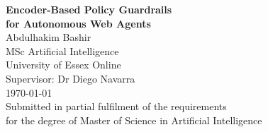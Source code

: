 \documentclass[12pt,a4paper]{article}
\begin{document}
\hypersetup{pageanchor=false}

\begin{titlepage}
\centering\vspace*{3cm}
{\LARGE\bfseries Encoder-Based Policy Guardrails\\[8pt]
for Autonomous Web Agents}\\[2cm]
{\large Abdulhakim Bashir}\\[0.5cm]
{\normalsize MSc Artificial Intelligence}\\[0.3cm]
{\normalsize University of Essex Online}\\[0.3cm]
{\normalsize Supervisor: Dr Diego Navarra}\\[3cm]
{\normalsize \today}\\[2cm]
{\normalsize Submitted in partial fulfilment of the requirements\\
for the degree of Master of Science in Artificial Intelligence}
\end{titlepage}

\setcounter{page}{1}
\tableofcontents
\clearpage
\end{document}
